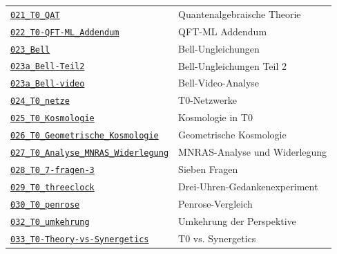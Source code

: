 {\begin{longtable}{@{}>{\raggedright\arraybackslash}p{} >{\raggedright\arraybackslash}p{}@{}}
\href{https://github.com/jpascher/T0-Time-Mass-Duality/blob/main/2/pdf/021_T0_QAT_De.pdf}{\texttt{021\_T0\_QAT}} & Quantenalgebraische Theorie \\
\href{https://github.com/jpascher/T0-Time-Mass-Duality/blob/main/2/pdf/022_T0-QFT-ML_Addendum_De.pdf}{\texttt{022\_T0-QFT-ML\_Addendum}} & QFT-ML Addendum \\
\href{https://github.com/jpascher/T0-Time-Mass-Duality/blob/main/2/pdf/023_Bell_De.pdf}{\texttt{023\_Bell}} & Bell-Ungleichungen \\
\href{https://github.com/jpascher/T0-Time-Mass-Duality/blob/main/2/pdf/023a_Bell-Teil2_De.pdf}{\texttt{023a\_Bell-Teil2}} & Bell-Ungleichungen Teil 2 \\
\href{https://github.com/jpascher/T0-Time-Mass-Duality/blob/main/2/pdf/023a_Bell-video_De.pdf}{\texttt{023a\_Bell-video}} & Bell-Video-Analyse \\
\href{https://github.com/jpascher/T0-Time-Mass-Duality/blob/main/2/pdf/024_T0_netze_De.pdf}{\texttt{024\_T0\_netze}} & T0-Netzwerke \\
\href{https://github.com/jpascher/T0-Time-Mass-Duality/blob/main/2/pdf/025_T0_Kosmologie_De.pdf}{\texttt{025\_T0\_Kosmologie}} & Kosmologie in T0 \\
\href{https://github.com/jpascher/T0-Time-Mass-Duality/blob/main/2/pdf/026_T0_Geometrische_Kosmologie_De.pdf}{\texttt{026\_T0\_Geometrische\_Kosmologie}} & Geometrische Kosmologie \\
\href{https://github.com/jpascher/T0-Time-Mass-Duality/blob/main/2/pdf/027_T0_Analyse_MNRAS_Widerlegung_De.pdf}{\texttt{027\_T0\_Analyse\_MNRAS\_Widerlegung}} & MNRAS-Analyse und Widerlegung \\
\href{https://github.com/jpascher/T0-Time-Mass-Duality/blob/main/2/pdf/028_T0_7-fragen-3_De.pdf}{\texttt{028\_T0\_7-fragen-3}} & Sieben Fragen \\
\href{https://github.com/jpascher/T0-Time-Mass-Duality/blob/main/2/pdf/029_T0_threeclock_De.pdf}{\texttt{029\_T0\_threeclock}} & Drei-Uhren-Gedankenexperiment \\
\href{https://github.com/jpascher/T0-Time-Mass-Duality/blob/main/2/pdf/030_T0_penrose_De.pdf}{\texttt{030\_T0\_penrose}} & Penrose-Vergleich \\
\href{https://github.com/jpascher/T0-Time-Mass-Duality/blob/main/2/pdf/032_T0_umkehrung_De.pdf}{\texttt{032\_T0\_umkehrung}} & Umkehrung der Perspektive \\
\href{https://github.com/jpascher/T0-Time-Mass-Duality/blob/main/2/pdf/033_T0-Theory-vs-Synergetics_De.pdf}{\texttt{033\_T0-Theory-vs-Synergetics}} & T0 vs. Synergetics \\

\end{longtable}}
